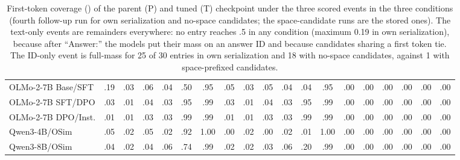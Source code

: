 \begin{table}[t]
\begin{tabular}{@{}lcccccccccccccccccc@{}}
OLMo-2-7B Base/SFT & .19 & .03 & .06 & .04 & .50 & .95 & .05 & .03 & .05 & .04 & .04 & .95 & .00 & .00 & .00 & .00 & .00 & .00 \\
OLMo-2-7B SFT/DPO & .03 & .01 & .04 & .03 & .95 & .99 & .03 & .01 & .04 & .03 & .95 & .99 & .00 & .00 & .00 & .00 & .00 & .00 \\
OLMo-2-7B DPO/Inst. & .01 & .01 & .03 & .03 & .99 & .99 & .01 & .01 & .03 & .03 & .99 & .99 & .00 & .00 & .00 & .00 & .00 & .00 \\
\addlinespace[2pt]
Qwen3-4B/OSim & .05 & .02 & .05 & .02 & .92 & 1.00 & .00 & .02 & .00 & .02 & .01 & 1.00 & .00 & .00 & .00 & .00 & .00 & .00 \\
Qwen3-8B/OSim & .04 & .02 & .04 & .06 & .74 & .99 & .02 & .02 & .03 & .06 & .20 & .99 & .00 & .00 & .00 & .00 & .00 & .00 \\
\bottomrule
\end{tabular}
\caption{First-token coverage (\ES{}) of the parent (P) and tuned (T) checkpoint under the three scored events in the three conditions (fourth follow-up run for own serialization and no-space candidates; the space-candidate runs are the stored ones). The text-only events are remainders everywhere: no entry reaches .5 in any condition (maximum 0.19 in own serialization), because after ``Answer:'' the models put their mass on an answer ID and because candidates sharing a first token tie. The ID-only event is full-mass for 25 of 30 entries in own serialization and 18 with no-space candidates, against 1 with space-prefixed candidates.}
\label{tab:events-coverage}
\end{table}
